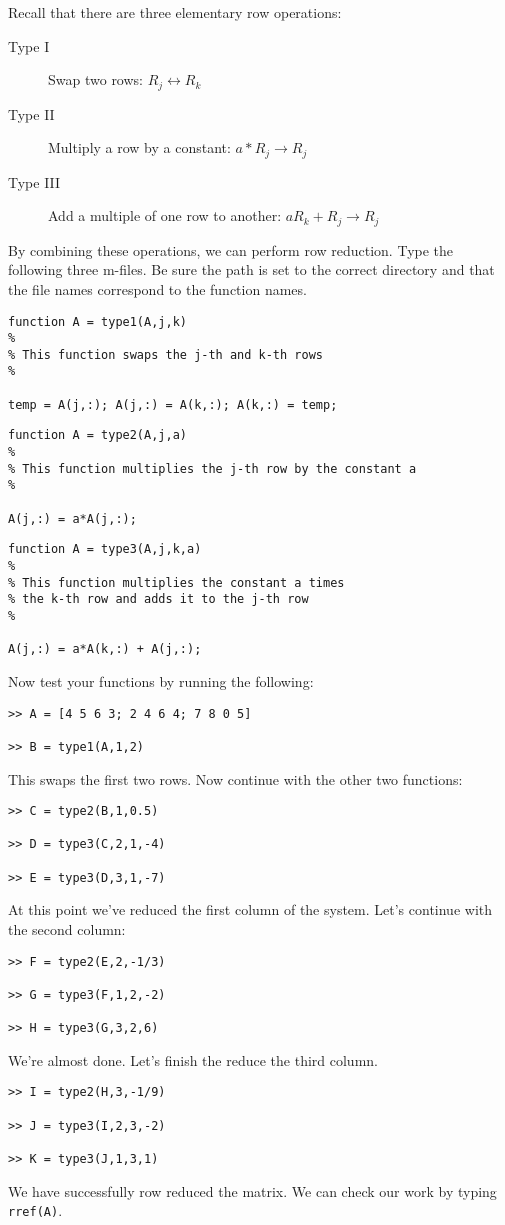 
Recall that there are three elementary row operations:

\begin{description}
\item[Type I]  Swap two rows: $R_j \longleftrightarrow R_k$
\item[Type II] Multiply a row by a constant:  $a* R_j \longrightarrow R_j$
\item[Type III] Add a multiple of one row to another: $ a R_k + R_j \longrightarrow R_j$
\end{description}
By combining these operations, we can perform row reduction. Type
the following three m-files.  Be sure the path is set to the correct
directory and that the file names correspond to the function names.

\begin{verbatim}
function A = type1(A,j,k)
%
% This function swaps the j-th and k-th rows
%

temp = A(j,:); A(j,:) = A(k,:); A(k,:) = temp;
\end{verbatim}

\begin{verbatim}
function A = type2(A,j,a)
%
% This function multiplies the j-th row by the constant a
%

A(j,:) = a*A(j,:);
\end{verbatim}

\begin{verbatim}
function A = type3(A,j,k,a)
%
% This function multiplies the constant a times
% the k-th row and adds it to the j-th row
%

A(j,:) = a*A(k,:) + A(j,:);
\end{verbatim}
Now test your functions by running the following:
\begin{verbatim}
>> A = [4 5 6 3; 2 4 6 4; 7 8 0 5]

>> B = type1(A,1,2)
\end{verbatim}
This swaps the first two rows. Now continue with the other two
functions:
\begin{verbatim}
>> C = type2(B,1,0.5)

>> D = type3(C,2,1,-4)

>> E = type3(D,3,1,-7)
\end{verbatim}
At this point we've reduced the first column of the system.  Let's
continue with the second column:
\begin{verbatim}
>> F = type2(E,2,-1/3)

>> G = type3(F,1,2,-2)

>> H = type3(G,3,2,6)
\end{verbatim}
We're almost done.  Let's finish the reduce the third column.
\begin{verbatim}
>> I = type2(H,3,-1/9)

>> J = type3(I,2,3,-2)

>> K = type3(J,1,3,1)
\end{verbatim}
We have successfully row reduced the matrix.  We can check our work
by typing {\tt rref(A)}.

